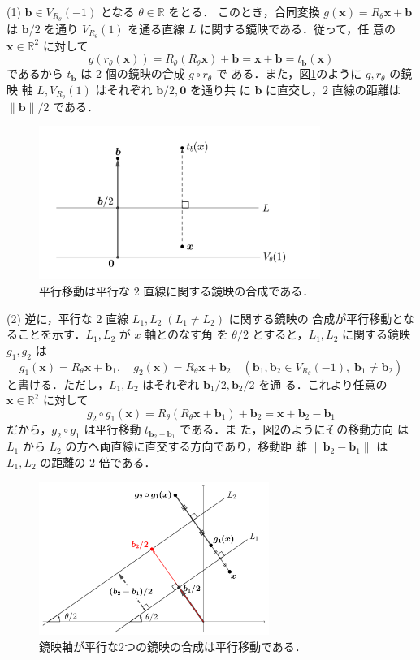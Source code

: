 \documentclass[11pt, uplatex, dvipdfmx, titlepage]{jsarticle}
\makeatletter
\renewenvironment{proof}[1][\proofname]{\par
  \pushQED{\qed}%
  \normalfont \topsep6\p@\@plus6\p@\relax
  \trivlist
  \item[\hskip\labelsep
         \bfseries
    {#1}]\ignorespaces
}{%
  \popQED\endtrivlist\@endpefalse
}
\theoremstyle{definition}
\renewcommand{\proofname}{\textbf{証明}}
\makeatother
\begin{document}
\begin{proof}
  (1) $\bm{b} \in V_{R_{\theta}}(-1)$ となる $\theta \in \mathbb{R}$ をとる．
  このとき，合同変換 $g(\bm{x})=R_{\theta}\bm{x}+\bm{b}$ は $\bm{b}/2$
  を通り $V_{R_{\theta}}(1)$ を通る直線 $L$ に関する鏡映である．従って，任
  意の $\bm{x} \in \mathbb{R}^2$ に対して
  \[
    g\left(r_{\theta}(\bm{x})\right) =
    R_{\theta}\left(R_{\theta}\bm{x}\right)+\bm{b} =
    \bm{x}+\bm{b}=t_{\bm{b}}(\bm{x})
  \]
  であるから $t_{\bm{b}}$ は $2$ 個の鏡映の合成 $g \circ r_{\theta}$ で
  ある．また，図\ref{fig:translation2}のように $g, r_{\theta}$ の鏡映
  軸 $L, V_{R_{\theta}}(1)$ はそれぞれ $\bm{b}/2, \bm{0}$ を通り共
  に $\bm{b}$ に直交し，$2$ 直線の距離は $\|\bm{b}\|/2$ である．
  \begin{figure}[h]
    \centering
    \includegraphics[height=5cm]{pictures/translation2.pdf}
    \caption{平行移動は平行な $2$ 直線に関する鏡映の合成である．}
    \label{fig:translation2}
  \end{figure}

  \noindent
  (2) 逆に，平行な $2$ 直線 $L_1, L_2 \; (L_1 \neq L_2)$ に関する鏡映の
  合成が平行移動となることを示す．$L_1, L_2$ が $x$ 軸とのなす角
  を $\theta/2$ とすると，$L_1, L_2$ に関する鏡映 $g_1, g_2$ は
  \[
    g_1(\bm{x}) = R_{\theta} \bm{x} + \bm{b}_1, \quad  g_2(\bm{x}) =R_{\theta}\bm{x} + \bm{b}_2 
    \quad \left( \bm{b}_1, \bm{b}_2 \in V_{R_{\theta}}(-1), \; \bm{b}_1 \neq \bm{b}_2\right)
  \]
  と書ける．ただし，$L_1, L_2$ はそれぞれ $\bm{b}_1/2, \bm{b}_2/2$ を通
  る．これより任意の $\bm{x} \in \mathbb{R}^2$ に対して
  \[
    g_2 \circ g_1 (\bm{x}) = R_{\theta}\left(R_{\theta}\bm{x} + \bm{b}_1\right)+\bm{b}_2
    = \bm{x} + \bm{b}_2 - \bm{b}_1
  \]
  だから，$g_2 \circ g_1$ は平行移動 $t_{\bm{b}_2-\bm{b}_1}$ である．ま
  た，図\ref{fig:translation2gen}のようにその移動方向
  は $L_1$ から $L_2$ の方へ両直線に直交する方向であり，移動距
  離 $\|\bm{b}_2-\bm{b}_1\|$ は $L_1, L_2$ の距離の $2$ 倍である．
  \begin{figure}[h]
    \centering
    \includegraphics[height=5cm]{pictures/translation2gen.pdf}
    \caption{鏡映軸が平行な2つの鏡映の合成は平行移動である．}
    \label{fig:translation2gen}
  \end{figure}
\end{proof}
\end{document}
